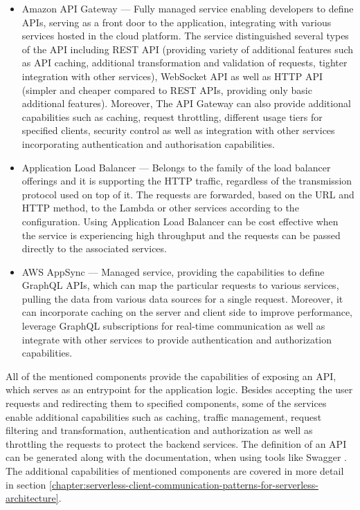 \begin{itemize}
   \item Amazon API Gateway ---
   Fully managed service enabling developers to define APIs, serving as a front door to the application, integrating with various services hosted in the cloud platform.
   The service distinguished several types of the API including REST API (providing variety of additional features such as API caching, additional transformation and validation of requests, tighter integration with other services), WebSocket API as well as HTTP API (simpler and cheaper compared to REST APIs, providing only basic additional features).
   Moreover, The API Gateway can also provide additional capabilities such as caching, request throttling, different usage tiers for specified clients, security control as well as integration with other services incorporating authentication and authorisation capabilities.
   \item Application Load Balancer ---
   Belongs to the family of the load balancer offerings and it is supporting the HTTP traffic, regardless of the transmission protocol used on top of it.
   The requests are forwarded, based on the URL and HTTP method, to the Lambda or other services according to the configuration.
   Using Application Load Balancer can be cost effective when the service is experiencing high throughput and the requests can be passed directly to the associated services.
   \item AWS AppSync ---
   Managed service, providing the capabilities to define GraphQL APIs, which can map the particular requests to various services, pulling the data from various data sources for a single request.
   Moreover, it can incorporate caching on the server and client side to improve performance, leverage GraphQL subscriptions for real-time communication as well as integrate with other services to provide authentication and authorization capabilities.
\end{itemize}

All of the mentioned components provide the capabilities of exposing an API, which serves as an entrypoint for the application logic.
Besides accepting the user requests and redirecting them to specified components, some of the services enable additional capabilities such as caching, traffic management, request filtering and transformation, authentication and authorization as well as throttling the requests to protect the backend services.
The definition of an API can be generated along with the documentation, when using tools like Swagger \cite{ImplementingMicroservicesOnAWS}.
The additional capabilities of mentioned components are covered in more detail in section \ref{chapter:serverless-client-communication-patterns-for-serverless-architecture}.

